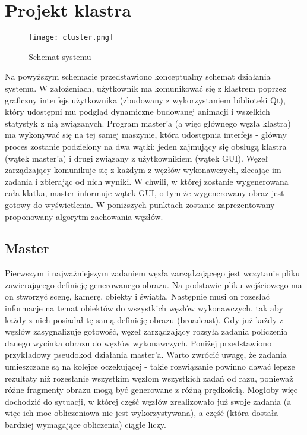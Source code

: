 \section{Projekt klastra}

\begin{figure}[h!]
\centering
  \caption{Schemat systemu}
  \texttt{[image: cluster.png]}
\end{figure}

	Na powyższym schemacie przedstawiono konceptualny schemat działania systemu. W założeniach, użytkownik ma komunikować się z klastrem poprzez graficzny interfejs użytkownika (zbudowany z wykorzystaniem biblioteki Qt), który udostępni mu podgląd dynamiczne budowanej animacji i wszelkich statystyk z nią związanych. Program master'a (a więc głównego węzła klastra) ma wykonywać się na tej samej maszynie, która udostępnia interfejs - główny proces zostanie podzielony na dwa wątki: jeden zajmujący się obsługą klastra (wątek master'a) i drugi związany z użytkownikiem (wątek GUI). Węzeł zarządzający komunikuje się z każdym z węzłów wykonawczych, zlecając im zadania i zbierając od nich wyniki. W chwili, w której zostanie wygenerowana cała klatka, master informuje wątek GUI, o tym że wygenerowany obraz jest gotowy do wyświetlenia. W poniższych punktach zostanie zaprezentowany proponowany algorytm zachowania węzłów.  
	
\subsection{Master}

Pierwszym i najważniejszym zadaniem węzła zarządzającego jest wczytanie pliku zawierającego definicję generowanego obrazu. Na podstawie pliku wejściowego ma on stworzyć scenę, kamerę, obiekty i światła. Następnie musi on rozesłać informacje na temat obiektów do wszystkich węzłów wykonawczych, tak aby każdy z nich posiadał tę samą definicję obrazu (broadcast). Gdy już każdy z węzłów zasygnalizuje gotowość, węzeł zarządzający rozsyła zadania policzenia danego wycinka obrazu do węzłów wykonawczych. Poniżej przedstawiono przykładowy pseudokod działania master'a. Warto zwrócić uwagę, że zadania umieszczane są na kolejce oczekującej - takie rozwiązanie powinno dawać lepsze rezultaty niż rozesłanie wszystkim węzłom wszystkich zadań od razu, ponieważ różne fragmenty obrazu mogą być generowane z różną prędkością. Mogłoby więc dochodzić do sytuacji, w której część węzłów zrealizowało już swoje zadania (a więc ich moc obliczeniowa nie jest wykorzystywana), a część (która dostała bardziej wymagające obliczenia) ciągle liczy.

